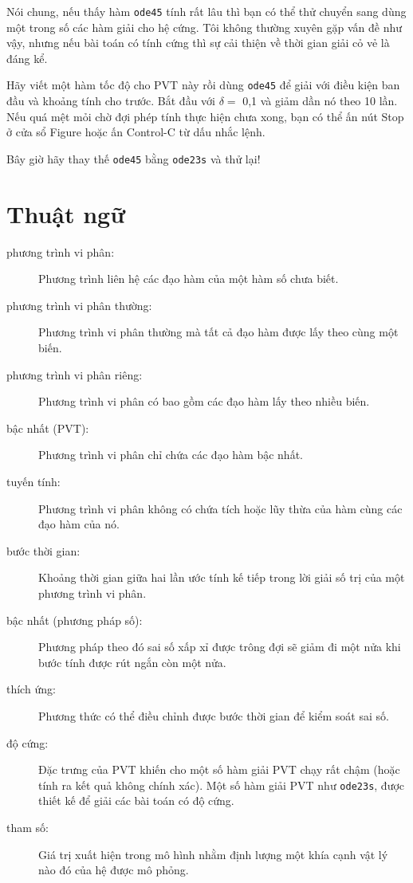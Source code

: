 \documentclass[12pt]{book}
\begin{document}
Nói chung, nếu thấy hàm {\tt ode45} tính rất lâu thì bạn có thể
thử chuyển sang dùng một trong số các hàm giải cho hệ cứng.
Tôi không thường xuyên gặp vấn đề như vậy, nhưng nếu bài toán
có tính cứng thì sự cải thiện về thời gian giải cỏ vẻ là đáng kể.

\begin{ex}
Hãy viết một hàm tốc độ cho PVT này rồi dùng {\tt ode45}
để giải với điều kiện ban đầu và khoảng tính cho trước.
Bắt đầu với $\delta = $ 0,1 và giảm dần nó theo 10 lần. Nếu
quá mệt mỏi chờ đợi phép tính thực hiện chưa xong, bạn có thể
ấn nút Stop ở cửa sổ Figure hoặc ấn Control-C từ dấu nhắc lệnh.

Bây giờ hãy thay thế {\tt ode45} bằng {\tt ode23s} và thử lại!
\end{ex}



\section{Thuật ngữ}

\begin{description}

\item[phương trình vi phân:] Phương trình liên hệ các đạo hàm
của một hàm số chưa biết.

\item[phương trình vi phân thường:] Phương trình vi phân thường mà
tất cả đạo hàm được lấy theo cùng một biến.

\item[phương trình vi phân riêng:] Phương trình vi phân có bao gồm các
đạo hàm lấy theo nhiều biến.

\item[bậc nhất (PVT):] Phương trình vi phân chỉ chứa các đạo hàm bậc nhất.

\item[tuyến tính:] Phương trình vi phân không có chứa tích hoặc lũy thừa
của hàm cùng các đạo hàm của nó.

\item[bước thời gian:] Khoảng thời gian giữa hai lần ước tính kế tiếp trong
lời giải số trị của một phương trình vi phân.

\item[bậc nhất (phương pháp số):] Phương pháp theo đó sai số xấp xỉ
được trông đợi sẽ giảm đi một nửa khi bước tính được rút ngắn còn một nửa.

\item[thích ứng:] Phương thức có thể điều chỉnh được bước thời gian để
kiểm soát sai số.

\item[độ cứng:] Đặc trưng của PVT khiến cho một số hàm giải PVT chạy
rất chậm (hoặc tính ra kết quả không chính xác). Một số hàm giải PVT
như {\tt ode23s}, được thiết kế để giải các bài toán có độ cứng.

\item[tham số:] Giá trị xuất hiện trong mô hình nhằm định lượng một khía
cạnh vật lý nào đó của hệ được mô phỏng.

\end{description}
\end{document}
